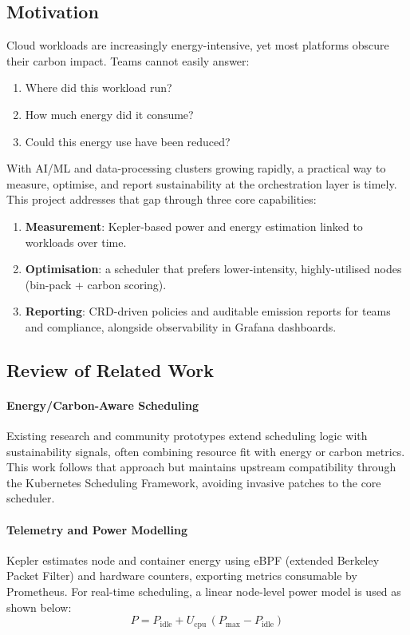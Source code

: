 \documentclass{article}
\begin{document}
\subsection{Motivation}

Cloud workloads are increasingly energy-intensive, yet most platforms obscure their carbon impact. Teams cannot easily
answer:
\begin{enumerate}
  \item Where did this workload run?
  \item How much energy did it consume?
  \item Could this energy use have been reduced?
\end{enumerate} 

With AI/ML and data-processing clusters growing rapidly, a practical way to measure, optimise, and
report sustainability at the orchestration layer is timely. This project addresses that gap through three core capabilities:
\begin{enumerate}
  \item \textbf{Measurement}: Kepler-based power and energy estimation linked to workloads over time.
  \item \textbf{Optimisation}: a scheduler that prefers lower-intensity, highly-utilised nodes (bin-pack + carbon scoring).
  \item \textbf{Reporting}: CRD-driven policies and auditable emission reports for teams and compliance, alongside observability in Grafana dashboards.
\end{enumerate}

\subsection{Review of Related Work}

\paragraph{Energy/Carbon-Aware Scheduling}
Existing research and community prototypes extend scheduling logic with sustainability signals, often combining resource
fit with energy or carbon metrics. This work follows that approach but maintains upstream compatibility through the
Kubernetes Scheduling Framework, avoiding invasive patches to the core scheduler.

\paragraph{Telemetry and Power Modelling}
Kepler estimates node and container energy using eBPF (extended Berkeley Packet Filter) and hardware counters, exporting metrics consumable by Prometheus.
For real-time scheduling, a linear node-level power model is used as shown below:
\[
P = P_{\text{idle}} + U_{\text{cpu}}\,(P_{\text{max}} - P_{\text{idle}})
\]
\end{document}
